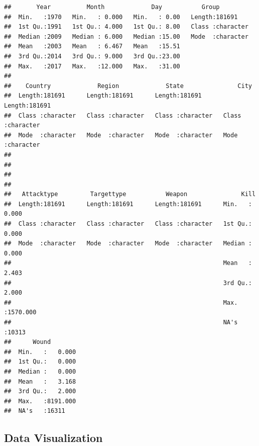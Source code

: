 \documentclass[
]{article}
\begin{document}
\begin{verbatim}
##       Year          Month             Day           Group          
##  Min.   :1970   Min.   : 0.000   Min.   : 0.00   Length:181691     
##  1st Qu.:1991   1st Qu.: 4.000   1st Qu.: 8.00   Class :character  
##  Median :2009   Median : 6.000   Median :15.00   Mode  :character  
##  Mean   :2003   Mean   : 6.467   Mean   :15.51                     
##  3rd Qu.:2014   3rd Qu.: 9.000   3rd Qu.:23.00                     
##  Max.   :2017   Max.   :12.000   Max.   :31.00                     
##                                                                    
##    Country             Region             State               City          
##  Length:181691      Length:181691      Length:181691      Length:181691     
##  Class :character   Class :character   Class :character   Class :character  
##  Mode  :character   Mode  :character   Mode  :character   Mode  :character  
##                                                                             
##                                                                             
##                                                                             
##                                                                             
##   Attacktype         Targettype           Weapon               Kill         
##  Length:181691      Length:181691      Length:181691      Min.   :   0.000  
##  Class :character   Class :character   Class :character   1st Qu.:   0.000  
##  Mode  :character   Mode  :character   Mode  :character   Median :   0.000  
##                                                           Mean   :   2.403  
##                                                           3rd Qu.:   2.000  
##                                                           Max.   :1570.000  
##                                                           NA's   :10313     
##      Wound         
##  Min.   :   0.000  
##  1st Qu.:   0.000  
##  Median :   0.000  
##  Mean   :   3.168  
##  3rd Qu.:   2.000  
##  Max.   :8191.000  
##  NA's   :16311
\end{verbatim}

\hypertarget{data-visualization}{%
\subsection{Data Visualization}\label{data-visualization}}
\end{document}
